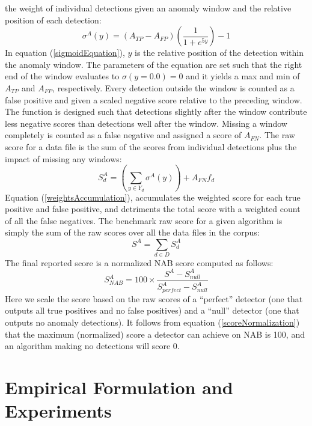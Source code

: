 \documentclass[12pt]{article}
\begin{document}
the weight of individual detections given an anomaly window
and the relative position of each detection:
\begin{equation}
\sigma^{A}(y) = (A_{TP} - A_{FP})(\frac{1}{1+e^{5y}})-1
\label{sigmoidEquation}
\end{equation}
In equation (\ref{sigmoidEquation}), $y$ is the relative position of the detection within the
anomaly window. The parameters of the equation are set such that
the right end of the window evaluates to $\sigma(y = 0.0) = 0$ and it yields a max and min of $A_{TP}$ and $A_{FP}$, respectively. Every detection outside the window is counted as
a false positive and given a scaled negative score relative to the
preceding window. The function is designed such that
detections slightly after the window contribute less negative
scores than detections well after the window. Missing a
window completely is counted as a false negative and assigned
a score of $A_{FN}$. The raw score for a data file is the sum of the scores from
individual detections plus the impact of missing any windows:
\begin{equation}
S^A_d = (\sum_{y \in Y_d} \sigma^A(y)) + A_{FN}f_d
\label{weightsAccumulation}
\end{equation}
Equation (\ref{weightsAccumulation}), accumulates the weighted score for each true positive
and false positive, and detriments the total score with a
weighted count of all the false negatives. The benchmark raw score for a given algorithm is simply the sum of the raw scores
over all the data files in the corpus:
\begin{equation}
S^A = \sum_{d \in D} S^A_d
\label{allScore}
\end{equation}
The final reported score is a normalized NAB score computed as follows:
\begin{equation}
S^A_{NAB} = 100 \times \frac{S^A - S^A_{null}}{S^A_{perfect} - S^A_{null}}
\label{scoreNormalization}
\end{equation}
Here we scale the score based on the raw scores of a “perfect”
detector (one that outputs all true positives and no false
positives) and a “null” detector (one that outputs no anomaly
detections). It follows from equation (\ref{scoreNormalization}) that the maximum (normalized) score a detector can achieve on NAB is 100, and an algorithm making no detections will score 0.

\section{Empirical Formulation and Experiments}
\end{document}
